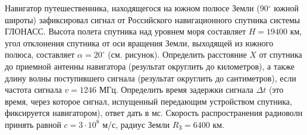 
Навигатор путешественника, находящегося на южном полюсе Земли (90$^{\circ}$ южной широты) зафиксировал сигнал от 
Российского навигационного спутника системы ГЛОНАСС. Высота полета спутника над уровнем моря составляет $H=19400$ км, угол 
отклонения спутника от оси вращения Земли, выходящей из южного полюса, составляет $\alpha=20^{\circ}$ (см. рисунок). 
Определить расстояние $X$ от спутника до приемной антенны навигатора (результат округлить до километров), а 
также длину волны поступившего сигнала (результат округлить до сантиметров), если частота сигнала $v=1246$ МГц. 
Определить время задержки сигнала $\Delta t$ (это время, через которое сигнал, испущенный передающим устройством 
спутника, фиксируется навигатором), ответ дать в мс. Скорость распространения радиоволн принять равной $c=3\cdot 10^8$ м/с, 
радиус Земли $R_\text{З}=6400$ км.

